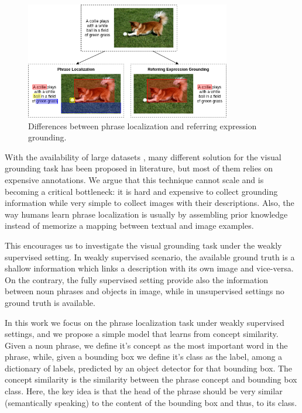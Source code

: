 \begin{figure}
  \centering
  \includegraphics[width=0.8\textwidth]{figures/dog-playing-with-ball.png}
  \caption[Differences between phrase localization and referring
    expression grounding]{ Differences between phrase localization and
    referring expression grounding.}
  \label{fig:dog-playing-with-ball}
\end{figure}

With the availability of large datasets
\cite{plummer2015flickr30k,kazemzadeh2014referitgame}, many different
solution for the visual grounding task has been proposed in
literature, but most of them relies on expensive annotations. We argue
that this technique cannot scale and is becoming a critical
bottleneck: it is hard and expensive to collect grounding information
while very simple to collect images with their descriptions. Also, the
way humans learn phrase localization is usually by assembling prior
knowledge instead of memorize a mapping between textual and image
examples.

This encourages us to investigate the visual grounding task under the
weakly supervised setting. In weakly supervised scenario, the
available ground truth is a shallow information which links a
description with its own image and vice-versa. On the contrary, the
fully supervised setting provide also the information between noun
phrases and objects in image, while in unsupervised settings no ground
truth is available.

In this work we focus on the phrase localization task under weakly
supervised settings, and we propose a simple model that learns from
concept similarity. Given a noun phrase, we define it's concept as the
most important word in the phrase, while, given a bounding box we
define it's class as the label, among a dictionary of labels,
predicted by an object detector for that bounding box. The concept
similarity is the similarity between the phrase concept and bounding
box class. Here, the key idea is that the head of the phrase should be
very similar (semantically speaking) to the content of the bounding
box and thus, to its class. 

